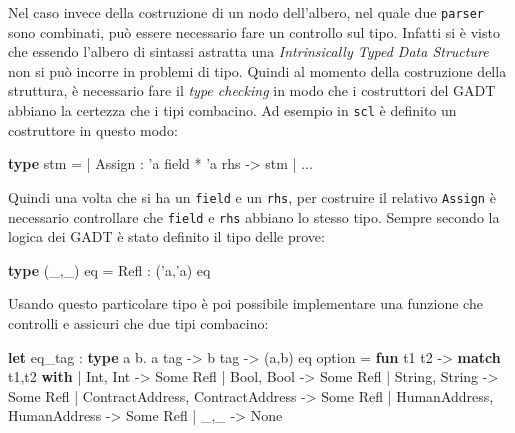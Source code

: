 \documentclass[]{article}
\newenvironment{Shaded}{}{}
\newcommand{\DataTypeTok}[1]{\textcolor[rgb]{0.56,0.13,0.00}{#1}}
\newcommand{\KeywordTok}[1]{\textcolor[rgb]{0.00,0.44,0.13}{\textbf{#1}}}
\newcommand{\NormalTok}[1]{#1}
\begin{document}
Nel caso invece della costruzione di un nodo dell'albero, nel quale due
\texttt{parser} sono combinati, può essere necessario fare un controllo
sul tipo. Infatti si è visto che essendo l'albero di sintassi astratta
una \emph{Intrinsically Typed Data Structure} non si può incorre in
problemi di tipo. Quindi al momento della costruzione della struttura, è
necessario fare il \emph{type checking} in modo che i costruttori del
GADT abbiano la certezza che i tipi combacino. Ad esempio in
\texttt{scl} è definito un costruttore in questo modo:

\begin{Shaded}
\begin{Highlighting}[]
\KeywordTok{type}\NormalTok{ stm =}
\NormalTok{ | Assign : 'a field * 'a rhs -> stm}
\NormalTok{ | ...}
\end{Highlighting}
\end{Shaded}

Quindi una volta che si ha un \texttt{field} e un \texttt{rhs}, per
costruire il relativo \texttt{Assign} è necessario controllare che
\texttt{field} e \texttt{rhs} abbiano lo stesso tipo. Sempre secondo la
logica dei GADT è stato definito il tipo delle prove:

\begin{Shaded}
\begin{Highlighting}[]
\KeywordTok{type}\NormalTok{ (_,_) eq = Refl : ('a,'a) eq}
\end{Highlighting}
\end{Shaded}

Usando questo particolare tipo è poi possibile implementare una funzione
che controlli e assicuri che due tipi combacino:

\begin{Shaded}
\begin{Highlighting}[]
\KeywordTok{let}\NormalTok{ eq_tag : }\KeywordTok{type}\NormalTok{ a b. a tag -> b tag -> (a,b) eq }\DataTypeTok{option}\NormalTok{ = }\KeywordTok{fun}\NormalTok{ t1 t2 ->}
 \KeywordTok{match}\NormalTok{ t1,t2 }\KeywordTok{with}
\NormalTok{ | Int, Int -> }\DataTypeTok{Some}\NormalTok{ Refl}
\NormalTok{ | Bool, Bool -> }\DataTypeTok{Some}\NormalTok{ Refl}
\NormalTok{ | }\DataTypeTok{String}\NormalTok{, }\DataTypeTok{String}\NormalTok{ -> }\DataTypeTok{Some}\NormalTok{ Refl}
\NormalTok{ | ContractAddress, ContractAddress -> }\DataTypeTok{Some}\NormalTok{ Refl}
\NormalTok{ | HumanAddress, HumanAddress -> }\DataTypeTok{Some}\NormalTok{ Refl}
\NormalTok{ | _,_ -> }\DataTypeTok{None}
\end{Highlighting}
\end{Shaded}
\end{document}
